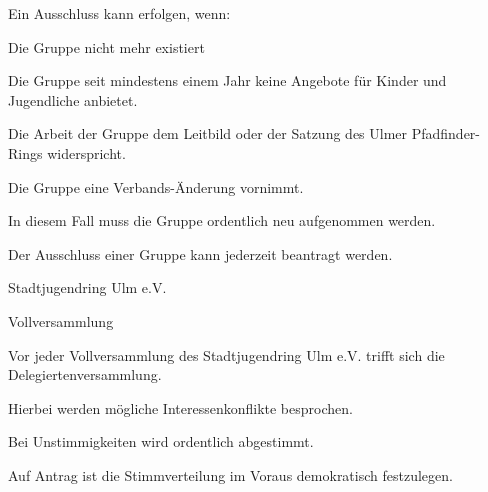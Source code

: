 \begin{legal}
\begin{legal}
                \begin{legal}
                    \item Ein Ausschluss kann erfolgen, wenn:
                        \begin{legal}
                            \item Die Gruppe nicht mehr existiert
                            \item Die Gruppe seit mindestens einem Jahr keine Angebote für Kinder 
                                  und Jugendliche anbietet.
                            \item Die Arbeit der Gruppe dem Leitbild oder der Satzung des Ulmer 
                                  Pfadfinder-Rings widerspricht.
                            \item Die Gruppe eine Verbands-Änderung vornimmt.
                                \begin{legal}
                                    \item In diesem Fall muss die Gruppe ordentlich neu aufgenommen 
                                          werden.
                                \end{legal}
                        \end{legal}
                    \item Der Ausschluss einer Gruppe kann jederzeit beantragt werden.
                \end{legal}
        \end{legal}
    \item Stadtjugendring Ulm e.V.
        \begin{legal}
            \item Vollversammlung
                \begin{legal}
                    \item Vor jeder Vollversammlung des Stadtjugendring Ulm e.V. trifft sich die 
                          Delegiertenversammlung.
                    \item Hierbei werden mögliche Interessenkonflikte besprochen.
                        \begin{legal}
                            \item Bei Unstimmigkeiten wird ordentlich abgestimmt.
                        \end{legal}
                    \item Auf Antrag ist die Stimmverteilung im Voraus demokratisch festzulegen.

\end{legal}
\end{legal}
\end{legal}
